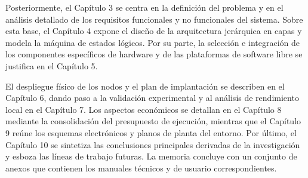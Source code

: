 Posteriormente, el Capítulo 3 se centra en la definición del problema y en el análisis detallado de los requisitos funcionales y no funcionales del sistema. Sobre esta base, el Capítulo 4 expone el diseño de la arquitectura jerárquica en capas y modela la máquina de estados lógicos. Por su parte, la selección e integración de los componentes específicos de hardware y de las plataformas de software libre se justifica en el Capítulo 5.

El despliegue físico de los nodos y el plan de implantación se describen en el Capítulo 6, dando paso a la validación experimental y al análisis de rendimiento local en el Capítulo 7. Los aspectos económicos se detallan en el Capítulo 8 mediante la consolidación del presupuesto de ejecución, mientras que el Capítulo 9 reúne los esquemas electrónicos y planos de planta del entorno. Por último, el Capítulo 10 se sintetiza las conclusiones principales derivadas de la investigación y esboza las líneas de trabajo futuras. La memoria concluye con un conjunto de anexos que contienen los manuales técnicos y de usuario correspondientes.